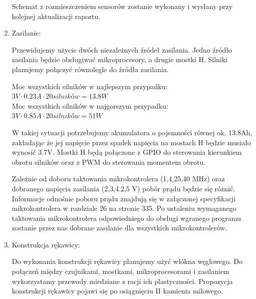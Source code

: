 \documentclass[a4paper]{article}
\begin{document}
\begin{enumerate}
Schemat z rozmieszczeniem sensorów zostanie wykonany i wysłany przy kolejnej aktualizacji raportu.

\item Zasilanie:

Przewidujemy użycie dwóch niezależnych źródeł zasilania. Jedno źródło zasilania będzie obsługiwać mikroprocesory, a drugie mostki H.
Silniki planujemy połączyć równolegle do źródła zasilania.

Moc wszystkich silników w najlepszym przypadku: \\
\begin{math}
3V \cdot 0.23A \cdot 20 silników = 13.8W
\end{math} \\
Moc wszystkich silników w najgorszym przypadku: \\
\begin{math}
3V \cdot 0.85A \cdot 20 silników = 51W
\end{math}

W takiej sytuacji potrzebujemy akumulatora o pojemności równej ok. 13.8Ah, zakładając że jej napięcie przez spadek napięcia na mostach H będzie musiało wynosić 3.7V. Mostki H będą połączone z GPIO do sterowania kierunkiem obrotu silników oraz z PWM do sterowania momentem obrotu.

Zależnie od doboru taktowania mikrokontrolera (1,4,25,40 MHz) oraz dobranego napięcia zasilania (2,3,4.2,5 V) pobór prądu będzie się różnić. Informacje odnośnie poboru prądu znajdują się w załączonej specyfikacji mikrokontrolera w rozdziale 26 na stronie 335. Po ustaleniu wymaganego taktowania mikrokontrolera odpowiedniego do obsługi wgranego programu zostanie przez nas dobrane zasilanie dla wszystkich mikrokontrolerów.

\item Konstrukcja rękawicy:

Do wykonania konstrukcji rękawicy planujemy użyć włókna węglowego. Do połączeń między czujnikami, mostkami, mikroprocesorami i zasilaniem wykorzystamy przewody miedziane z racji ich plastyczności. Propozycja konstrukcji rękawicy pojawi się po osiągnięciu II kamienia milowego.

\end{enumerate}
\end{document}
